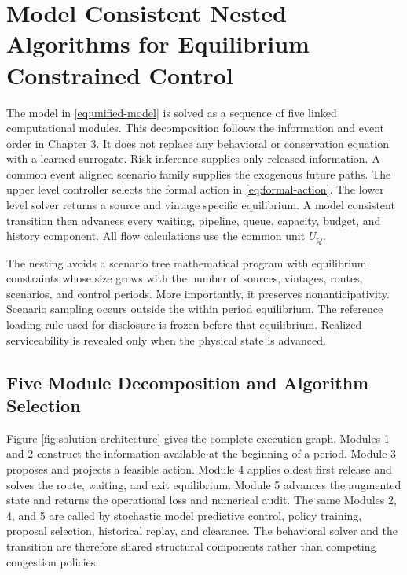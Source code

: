 \documentclass[a4paper,fleqn]{cas-sc}
\begin{document}
\clearpage
\section{Model Consistent Nested Algorithms for Equilibrium Constrained Control}
\label{sec:solution}

The model in \cref{eq:unified-model} is solved as a sequence of five linked
computational modules. This decomposition follows the information and event
order in Chapter 3. It does not replace any behavioral or conservation
equation with a learned surrogate. Risk inference supplies only released
information. A common event aligned scenario family supplies the exogenous
future paths. The upper level controller selects the formal action in
\cref{eq:formal-action}. The lower level solver returns a source and vintage
specific equilibrium. A model consistent transition then advances every
waiting, pipeline, queue, capacity, budget, and history component. All flow
calculations use the common unit $U_Q$.

The nesting avoids a scenario tree mathematical program with equilibrium
constraints whose size grows with the number of sources, vintages, routes,
scenarios, and control periods. More importantly, it preserves
nonanticipativity. Scenario sampling occurs outside the within period
equilibrium. The reference loading rule used for disclosure is frozen before
that equilibrium. Realized serviceability is revealed only when the physical
state is advanced.

\subsection{Five Module Decomposition and Algorithm Selection}
\label{subsec:algorithm-selection}

Figure \ref{fig:solution-architecture} gives the complete execution graph.
Modules 1 and 2 construct the information available at the beginning of a
period. Module 3 proposes and projects a feasible action. Module 4 applies
oldest first release and solves the route, waiting, and exit equilibrium.
Module 5 advances the augmented state and returns the operational loss and
numerical audit. The same Modules 2, 4, and 5 are called by stochastic model
predictive control, policy training, proposal selection, historical replay,
and clearance. The behavioral solver and the transition are therefore shared
structural components rather than competing congestion policies.
\end{document}
